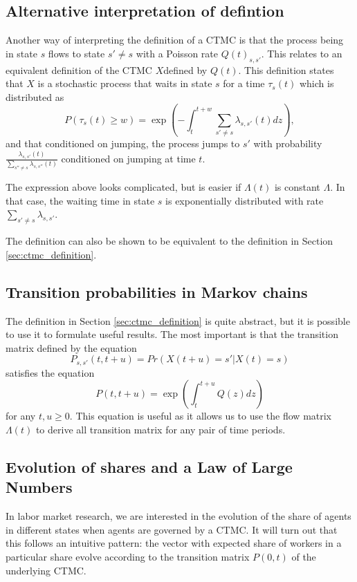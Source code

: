\documentclass[11pt]{article}
\begin{document}
\subsection{Alternative interpretation of defintion}
Another way of interpreting the definition of a CTMC is that the process being in state $s$ flows to state $s'\neq s$ with a Poisson rate $Q(t)_{s,s'}$. This relates to an equivalent definition of the CTMC $X$defined by $Q(t)$. This definition states that $X$ is a stochastic process that waits in state $s$ for a time $\tau_s(t)$ which is distributed as
\[
P(\tau_s(t) \ge w)=\exp\left(-\int_{t}^{t+w} \sum_{s'\neq s} \lambda_{s,s'}(t)dz\right),
\]
and that conditioned on jumping, the process jumps to $s'$ with probability $\frac{\lambda_{s,s'}(t)}{\sum_{s''\neq s} \lambda_{s,s''}(t)}$ conditioned on jumping at time $t$.

The expression above looks complicated, but is easier if $\Lambda(t)$ is constant $\Lambda$. In that case, the waiting time in state $s$ is exponentially distributed with rate $\sum_{s'\neq s} \lambda_{s,s'}$.

The definition can also be shown to be equivalent to the definition in Section \ref{sec:ctmc_definition}.

\subsection{Transition probabilities in Markov chains}
The definition in Section \ref{sec:ctmc_definition} is quite abstract, but it is possible to use it to formulate useful results. The most important is that the transition matrix defined by the equation
\[
P_{s,s'}(t,t+u)=Pr(X(t+u) = s' | X(t)=s)
\]
satisfies the equation
\[
P(t,t+u) = \exp\left(\int_{t}^{t+u} Q(z)dz\right)
\]
for any $t,u\ge 0$. This equation is useful as it allows us to use the flow matrix $\Lambda(t)$ to derive all transition matrix for any pair of time periods.

\subsection{Evolution of shares and a Law of Large Numbers}
In labor market research, we are interested in the evolution of the share of agents in different states when agents are governed by a CTMC. It will turn out that this follows an intuitive pattern: the vector with expected share of workers in a particular share evolve according to the transition matrix $P(0,t)$ of the underlying CTMC.
\end{document}
